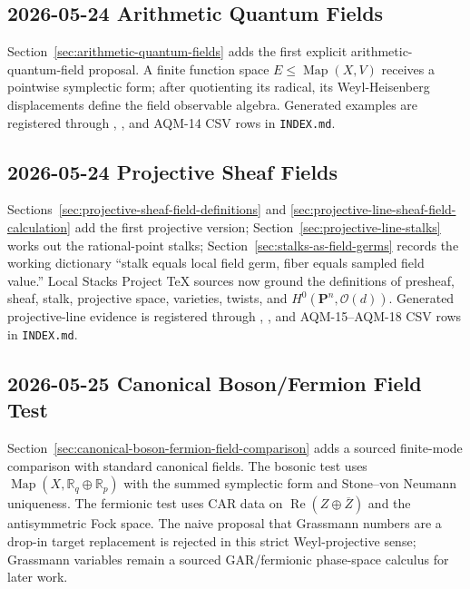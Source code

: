 \subsection*{2026-05-24 Arithmetic Quantum Fields}

Section~\ref{sec:arithmetic-quantum-fields} adds the first explicit
arithmetic-quantum-field proposal.  A finite function space
\(E\leq\operatorname{Map}(X,V)\) receives a pointwise symplectic form; after
quotienting its radical, its Weyl-Heisenberg displacements define the field
observable algebra.  Generated examples are registered through , , and AQM-14 CSV rows in \texttt{INDEX.md}.

\subsection*{2026-05-24 Projective Sheaf Fields}

Sections~\ref{sec:projective-sheaf-field-definitions} and
\ref{sec:projective-line-sheaf-field-calculation} add the first projective
version; Section~\ref{sec:projective-line-stalks} works out the rational-point
stalks; Section~\ref{sec:stalks-as-field-germs} records the working dictionary
``stalk equals local field germ, fiber equals sampled field value.''  Local
Stacks Project TeX sources now ground the definitions of presheaf, sheaf,
stalk, projective space, varieties, twists, and
\(H^0(\mathbf P^n,\mathcal O(d))\).  Generated projective-line evidence is registered through , , and AQM-15--AQM-18 CSV rows in \texttt{INDEX.md}.

\subsection*{2026-05-25 Canonical Boson/Fermion Field Test}

Section~\ref{sec:canonical-boson-fermion-field-comparison} adds a sourced
finite-mode comparison with standard canonical fields.  The bosonic test uses
\(\operatorname{Map}(X,\mathbb R_q\oplus\mathbb R_p)\) with the summed
symplectic form and Stone--von Neumann uniqueness.  The fermionic test uses
CAR data on \(\operatorname{Re}(Z\oplus\overline Z)\) and the antisymmetric
Fock space.  The naive proposal that Grassmann numbers are a drop-in target
replacement is rejected in this strict Weyl-projective sense; Grassmann
variables remain a sourced GAR/fermionic phase-space calculus for later work.

